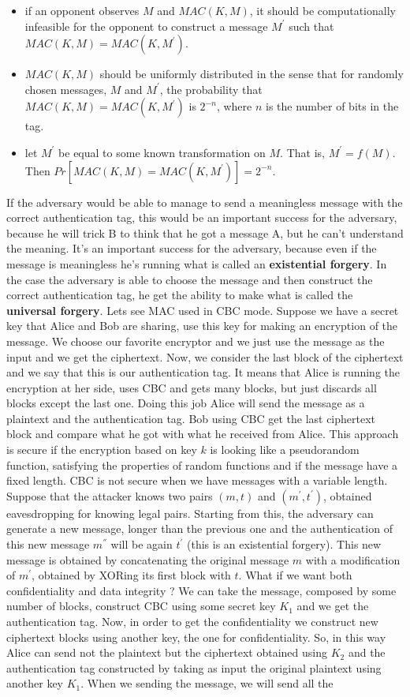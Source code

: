 \documentclass[11pt]{article}
\begin{document}
\begin{itemize}
\item if an opponent observes $M$ and $MAC(K, M)$, it should be computationally infeasible for the opponent to construct a message $M^{'}$ such that $MAC(K, M) = MAC(K, M^{'})$.
\item $MAC(K, M)$ should be uniformly distributed in the sense that for randomly chosen messages, $M$ and $M^{'}$, the probability that $MAC(K, M) = MAC(K, M^{'})$ is $2^{-n}$, where $n$ is the number of bits in the tag.
\item let $M^{'}$ be equal to some known transformation on $M$. That is, $M^{'} = f(M)$. Then $Pr[ MAC(K, M) = MAC(K, M^{'})] = 2^{-n}$.
\end{itemize}
If the adversary would be able to manage to send a meaningless message with the correct authentication tag, this would be an important success for the adversary, because he will trick B to think that he got a message A, but he can't understand the meaning. It's an important success for the adversary, because even if the message is meaningless he's running what is called an \textbf{existential forgery}. In the case the adversary is able to choose the message and then construct the correct authentication tag, he get the ability to make what is called the \textbf{universal forgery}. Lets see MAC used in CBC mode. Suppose we have a secret key that Alice and Bob are sharing, use this key for making an encryption of the message. We choose our favorite encryptor and we just use the message as the input and we get the ciphertext. Now, we consider the last block of the ciphertext and we say that this is our authentication tag. It means that Alice is running the encryption at her side, uses CBC and gets many blocks, but just discards all blocks except the last one. Doing this job Alice will send the message as a plaintext and the authentication tag. Bob using CBC get the last ciphertext block and compare what he got with what he received from Alice. This approach is secure if the encryption based on key $k$ is looking like a pseudorandom function, satisfying the properties of random functions and if the message have a fixed length. CBC is not secure when we have messages with a variable length. Suppose that the attacker knows two pairs $(m, t)$ and $(m^{'}, t^{'})$, obtained eavesdropping for knowing legal pairs. Starting from this, the adversary can generate a new message, longer than the previous one and the authentication of this new message $m^{''}$ will be again $t^{'}$ (this is an existential forgery). This new message is obtained by concatenating the original message $m$ with a modification of $m^{'}$, obtained by XORing its first block with $t$. What if we want both confidentiality and data integrity ? We can take the message, composed by some number of blocks, construct CBC using some secret key $K_1$ and we get the authentication tag. Now, in order to get the confidentiality we construct new ciphertext blocks using another key, the one for confidentiality. So, in this way Alice can send not the plaintext but the ciphertext obtained using $K_2$ and the authentication tag constructed by taking as input the original plaintext using another key $K_1$. When we sending the message, we will send all the 
\end{document}
